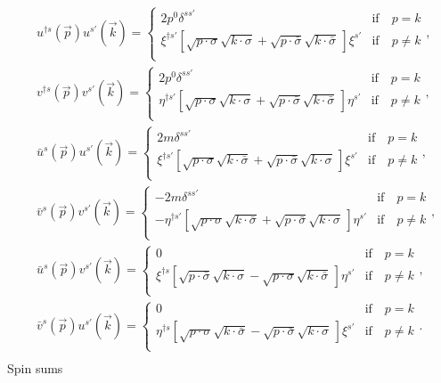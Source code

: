 \begin{equation}
	\begin{split}
		&u^{\dagger s}(\vec{p})u^{s'}(\vec{k})=\begin{cases}
			2p^0\delta^{ss'} & \text{if}\quad p=k\\
			\xi^{\dagger s'}[\sqrt{p\cdot \sigma}\sqrt{k\cdot \sigma}+\sqrt{p\cdot \bar{\sigma}}\sqrt{k\cdot \bar{\sigma}}\,]\xi^{s'}& \text{if}\quad p\neq k\\  
		\end{cases},\\
		&v^{\dagger s}(\vec{p})v^{s'}(\vec{k})=\begin{cases}
			2p^0\delta^{ss'} & \text{if}\quad p=k\\
			\eta^{\dagger s'}[\sqrt{p\cdot \sigma}\sqrt{k\cdot \sigma}+\sqrt{p\cdot \bar{\sigma}}\sqrt{k\cdot \bar{\sigma}}\,]\eta^{ s'}& \text{if}\quad p\neq k\\  
		\end{cases},\\
		&\bar{u}^{s}(\vec{p})u^{s'}(\vec{k})=\begin{cases}
			2m\delta^{ss'} & \text{if}\quad p=k\\
			\xi^{\dagger s'}[\sqrt{p\cdot \sigma}\sqrt{k\cdot \bar{\sigma}}+\sqrt{p\cdot \bar{\sigma}}\sqrt{k\cdot \sigma} \,]\xi^{ s'}& \text{if}\quad p\neq k\\  
		\end{cases},\\
		&\bar{v}^{s}(\vec{p})v^{s'}(\vec{k})=\begin{cases}
			-2m\delta^{ss'} & \text{if}\quad p=k\\
			-\eta^{\dagger s'}[\sqrt{p\cdot \sigma}\sqrt{k\cdot \bar{\sigma}}+\sqrt{p\cdot \bar{\sigma}}\sqrt{k\cdot \sigma} \,]\eta^{s'} & \text{if}\quad p\neq k\\ 
		\end{cases},\\
		&\bar{u}^{s}(\vec{p})v^{s'}(\vec{k})=\begin{cases}
			0 & \text{if}\quad p=k\\
			\xi^{\dagger s}[\sqrt{p\cdot \bar{\sigma}}\sqrt{k\cdot \sigma}-\sqrt{p\cdot \sigma}\sqrt{k\cdot \bar{\sigma}} \,] \eta^{s'} & \text{if}\quad p\neq k\\  
		\end{cases},\\
		&\bar{v}^{s}(\vec{p})u^{s'}(\vec{k})=\begin{cases}
			0 & \text{if}\quad p=k\\
			\eta^{\dagger s}[\sqrt{p\cdot \sigma}\sqrt{k\cdot \bar{\sigma}}-\sqrt{p\cdot \bar{\sigma}}\sqrt{k\cdot \sigma} \,] \xi^{s'}  & \text{if}\quad p\neq k\\  
		\end{cases}.\\
	\end{split}
\end{equation} 
Spin sums

